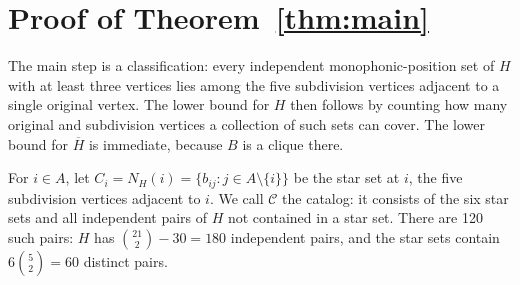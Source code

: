 \documentclass[11pt]{article}
\theoremstyle{remark}
\begin{document}
\section{Proof of Theorem~\ref{thm:main}}\label{sec:proof}
The main step is a classification: every independent
monophonic-position set of $H$ with at least three vertices lies among
the five subdivision vertices adjacent to a single original vertex. The
lower bound for $H$ then follows by counting how many original and
subdivision vertices a collection of such sets can cover. The lower bound
for $\overline H$ is immediate, because $B$ is a clique there.

For $i\in A$, let $C_i=N_H(i)=\{b_{ij}:j\in A\setminus\{i\}\}$ be the
star set at $i$, the five subdivision vertices adjacent to $i$. We call
$\mathcal C$ the catalog: it consists of the six star sets and all
independent pairs of $H$ not contained in a star set. There are 120 such
pairs: $H$ has $\binom{21}{2}-30=180$ independent pairs, and the star sets
contain $6\binom{5}{2}=60$ distinct pairs.
\end{document}
